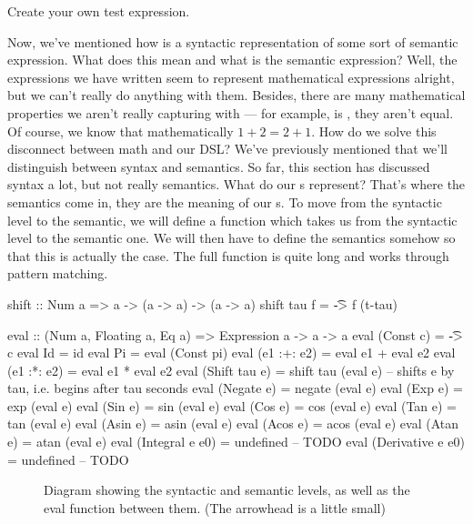 \begin{exercise}
Create your own test expression.
\end{exercise}
Now, we've mentioned how  is a syntactic
representation of some sort of semantic expression. What does this mean and what
is the semantic expression? Well, the expressions we have written seem to
represent mathematical expressions alright, but we can't really do anything with
them. Besides, there are many mathematical properties we aren't really capturing
with  --- for example,  is , they aren't equal. Of course, we know that
mathematically $1+2=2+1$. How do we solve this disconnect between math and our DSL? 
We've previously mentioned  that we'll distinguish between syntax and
semantics. So far, this section has discussed syntax a lot, but not really semantics. What
do our s represent? That's where the semantics come in, they are
the meaning of our s. To move from the syntactic level to the
semantic, we will define a function  which takes us from the syntactic
level to the semantic one. 
We will then have to define the semantics somehow so that this is actually the case. 
The full function is quite long and works through pattern matching. 
\begin{code}
shift :: Num a => a -> (a -> a) -> (a -> a)
shift tau f = \t -> f (t-tau)

eval :: (Num a, Floating a, Eq a) => Expression a -> a -> a
eval (Const c)           = \t -> c
eval Id                  = id
eval Pi                  = eval (Const pi)
eval (e1 :+: e2)         = eval e1 + eval e2
eval (e1 :*: e2)         = eval e1 * eval e2
eval (Shift tau e)       = shift tau (eval e) -- shifts e by tau, i.e. begins after tau seconds
eval (Negate e)          = negate (eval e)
eval (Exp e)             = exp    (eval e)
eval (Sin e)             = sin    (eval e)
eval (Cos e)             = cos    (eval e)
eval (Tan e)             = tan    (eval e)
eval (Asin e)            = asin   (eval e)
eval (Acos e)            = acos   (eval e)
eval (Atan e)            = atan   (eval e)
eval (Integral   e e0)   = undefined -- TODO
eval (Derivative e e0)   = undefined -- TODO
\end{code}
\begin{figure}
  \centering
  \caption[Diagram: syntax, eval, semantics]{Diagram showing the syntactic and
    semantic levels, as well as the eval function between them. (The arrowhead
    is a little small)}
  \label{fig:diagram-eval}
\end{figure}
